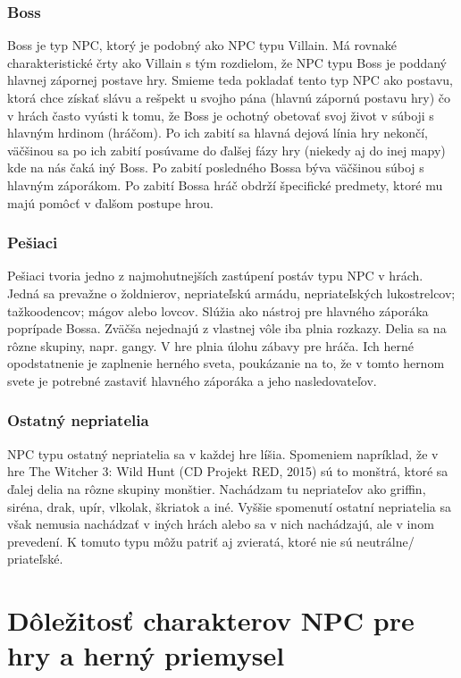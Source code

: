 \documentclass[10pt,twoside,slovak,a4paper]{article}
\begin{document}
\subsubsection{Boss} \label{BOSS}
Boss je typ NPC, ktorý je podobný ako NPC typu Villain. Má rovnaké charakteristické črty ako Villain s tým rozdielom, že NPC typu Boss je poddaný hlavnej zápornej postave hry. Smieme teda pokladať tento typ NPC ako postavu, ktorá chce získať slávu a rešpekt u svojho pána (hlavnú zápornú postavu hry) čo v hrách často vyústi k tomu, že Boss je ochotný obetovať svoj život v súboji s hlavným hrdinom (hráčom). Po ich zabití sa hlavná dejová línia hry nekončí, väčšinou sa po ich zabití posúvame do ďalšej fázy hry (niekedy aj do inej mapy) kde na nás čaká iný Boss. Po zabití posledného Bossa býva väčšinou súboj s hlavným záporákom. Po zabití Bossa hráč obdrží špecifické predmety, ktoré mu majú pomôcť v ďalšom postupe hrou. 

\subsubsection{Pešiaci} \label{Pesiaci}
Pešiaci tvoria jedno z najmohutnejších zastúpení postáv typu NPC v hrách. Jedná sa prevažne o žoldnierov, nepriateľskú armádu, nepriateľských lukostrelcov; tažkoodencov;  mágov alebo lovcov. Slúžia ako nástroj pre hlavného záporáka poprípade Bossa. Zväčša nejednajú z vlastnej vôle iba plnia rozkazy. Delia sa na rôzne skupiny, napr. gangy. V hre plnia úlohu zábavy pre hráča. Ich herné opodstatnenie je zaplnenie herného sveta, poukázanie na to, že v tomto hernom svete je potrebné zastaviť hlavného záporáka a jeho nasledovateľov.  

\subsubsection{Ostatný nepriatelia} \label{Ostatny_nepriatelia}
NPC typu ostatný nepriatelia sa v každej hre líšia. Spomeniem napríklad, že v hre The Witcher 3: Wild Hunt (CD Projekt RED, 2015) sú to monštrá, ktoré sa ďalej delia na rôzne skupiny monštier. Nachádzam tu nepriateľov ako griffin, siréna, drak, upír, vlkolak, škriatok a iné.  Vyššie spomenutí ostatní nepriatelia sa však nemusia nachádzať v iných hrách alebo sa v nich nachádzajú, ale v inom prevedení. K tomuto typu môžu patriť aj zvieratá, ktoré nie sú neutrálne/ priateľské.


\section{Dôležitosť charakterov NPC pre hry a herný priemysel}   \label{Dolezitost}
\end{document}
